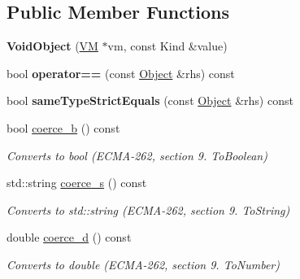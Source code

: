 \subsection*{Public Member Functions}
\begin{DoxyCompactItemize}
\item 
\hypertarget{classjswf_1_1avm2_1_1_void_object_a05408d5ee05d4cae0d77147850592b2b}{{\bfseries Void\+Object} (\hyperlink{classjswf_1_1avm2_1_1_v_m}{V\+M} $\ast$vm, const Kind \&value)}\label{classjswf_1_1avm2_1_1_void_object_a05408d5ee05d4cae0d77147850592b2b}

\item 
\hypertarget{classjswf_1_1avm2_1_1_void_object_a93119839707e760bec254e4d7c99d9e0}{bool {\bfseries operator==} (const \hyperlink{classjswf_1_1avm2_1_1_object}{Object} \&rhs) const }\label{classjswf_1_1avm2_1_1_void_object_a93119839707e760bec254e4d7c99d9e0}

\item 
\hypertarget{classjswf_1_1avm2_1_1_void_object_a7a7d6f81c6f9d9b6c18b4cd68f30763d}{bool {\bfseries same\+Type\+Strict\+Equals} (const \hyperlink{classjswf_1_1avm2_1_1_object}{Object} \&rhs) const }\label{classjswf_1_1avm2_1_1_void_object_a7a7d6f81c6f9d9b6c18b4cd68f30763d}

\item 
\hypertarget{classjswf_1_1avm2_1_1_void_object_a24dda33beeb086bd51b0a847e24d9116}{bool \hyperlink{classjswf_1_1avm2_1_1_void_object_a24dda33beeb086bd51b0a847e24d9116}{coerce\+\_\+b} () const }\label{classjswf_1_1avm2_1_1_void_object_a24dda33beeb086bd51b0a847e24d9116}

\begin{DoxyCompactList}\small\item\em Converts to {\ttfamily bool} (E\+C\+M\+A-\/262, section 9. {\itshape To\+Boolean}) \end{DoxyCompactList}\item 
std\+::string \hyperlink{classjswf_1_1avm2_1_1_void_object_a4aaf0973c931a1d8bd3be76f367bdd0f}{coerce\+\_\+s} () const 
\begin{DoxyCompactList}\small\item\em Converts to {\ttfamily std\+::string} (E\+C\+M\+A-\/262, section 9. {\itshape To\+String}) \end{DoxyCompactList}\item 
\hypertarget{classjswf_1_1avm2_1_1_void_object_a12fdaa2a4666f25efe0cbf9d4126b3a6}{double \hyperlink{classjswf_1_1avm2_1_1_void_object_a12fdaa2a4666f25efe0cbf9d4126b3a6}{coerce\+\_\+d} () const }\label{classjswf_1_1avm2_1_1_void_object_a12fdaa2a4666f25efe0cbf9d4126b3a6}

\begin{DoxyCompactList}\small\item\em Converts to {\ttfamily double} (E\+C\+M\+A-\/262, section 9. {\itshape To\+Number}) \end{DoxyCompactList}\end{DoxyCompactItemize}
